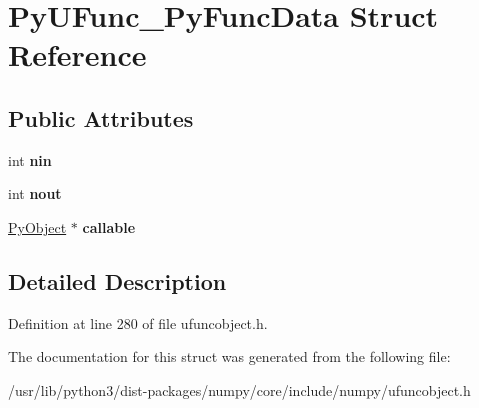 \hypertarget{structPyUFunc__PyFuncData}{}\section{Py\+U\+Func\+\_\+\+Py\+Func\+Data Struct Reference}
\label{structPyUFunc__PyFuncData}
\subsection*{Public Attributes}
\begin{DoxyCompactItemize}
\item 
int {\bfseries nin}\hypertarget{structPyUFunc__PyFuncData_a0cd94ed840dcbbcffe4c2de373f5602b}{}\label{structPyUFunc__PyFuncData_a0cd94ed840dcbbcffe4c2de373f5602b}

\item 
int {\bfseries nout}\hypertarget{structPyUFunc__PyFuncData_abfd42839e23c29c59747c0a6fb9a0b0b}{}\label{structPyUFunc__PyFuncData_abfd42839e23c29c59747c0a6fb9a0b0b}

\item 
\hyperlink{struct__object}{Py\+Object} $\ast$ {\bfseries callable}\hypertarget{structPyUFunc__PyFuncData_a55d7841f345ae1cf2f7bb9ef42097f16}{}\label{structPyUFunc__PyFuncData_a55d7841f345ae1cf2f7bb9ef42097f16}

\end{DoxyCompactItemize}


\subsection{Detailed Description}


Definition at line 280 of file ufuncobject.\+h.



The documentation for this struct was generated from the following file\+:\begin{DoxyCompactItemize}
\item 
/usr/lib/python3/dist-\/packages/numpy/core/include/numpy/ufuncobject.\+h\end{DoxyCompactItemize}
